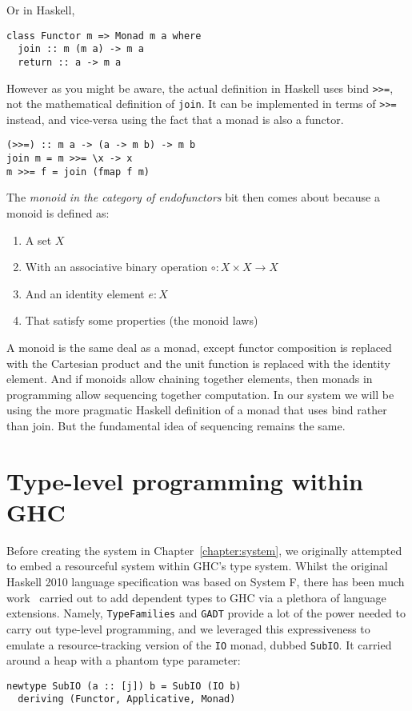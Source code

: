 Or in Haskell,
\begin{verbatim}
class Functor m => Monad m a where
  join :: m (m a) -> m a
  return :: a -> m a
\end{verbatim}
However as you might be aware, the actual definition in Haskell uses
bind \texttt{>>=}, not the mathematical definition of
\texttt{join}. It can be implemented in terms of
\texttt{>>=} instead, and vice-versa using the fact that
a monad is also a functor.
\begin{verbatim}
(>>=) :: m a -> (a -> m b) -> m b
join m = m >>= \x -> x
m >>= f = join (fmap f m)
\end{verbatim}

The \textit{monoid in the category of endofunctors} bit then comes
about because a monoid is defined as:
\begin{enumerate}
\item A set $X$
\item With an associative binary operation $\circ : X \times X \rightarrow X$
\item And an identity element $e : X$
\item That satisfy some properties (the monoid laws)
\end{enumerate}

A monoid is the same deal as a monad, except functor composition is
replaced with the Cartesian product and the unit function is replaced
with the identity element.  And if monoids allow chaining together
elements, then monads in programming allow sequencing together
computation. In our system we will be using the more pragmatic Haskell
definition of a monad that uses bind rather than join. But the
fundamental idea of sequencing remains the same.

\section{Type-level programming within GHC}


Before creating the system in Chapter~\ref{chapter:system}, we
originally attempted to embed a resourceful system within GHC's type
system. Whilst the original Haskell 2010 language specification was
based on System F, there has been much
work~\cite{eisenberg2016}\cite{weirich2017} carried out to add
dependent types to GHC via a plethora of language extensions. Namely,
\texttt{TypeFamilies} and \texttt{GADT} provide a lot of the power
needed to carry out type-level programming, and we leveraged this
expressiveness to emulate a resource-tracking version of the
\texttt{IO} monad, dubbed \texttt{SubIO}. It
carried around a heap with a phantom type parameter:
\begin{verbatim}
newtype SubIO (a :: [j]) b = SubIO (IO b)
  deriving (Functor, Applicative, Monad)
\end{verbatim}

